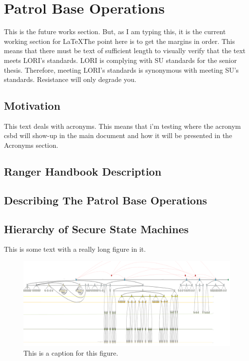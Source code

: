 \documentclass[../../main/main.tex]{subfiles}
\begin{document}
\chapter{Patrol Base Operations}
This is the future works section. But, as I am typing this, it is the current working section for \LaTeX\.  The point here is to get the margins in order.   This means that there must be text of sufficient length to visually verify that the text meets LORI's standards.  LORI is complying with SU standards for the senior thesis.  Therefore, meeting LORI's standards is synonymous with meeting SU's standards.  Resistance will only degrade you.
\section{Motivation}
This text deals with acronyms.  This means that i'm testing where the acronym \Gls{csbd} will show-up in the main document and how it will be presented in the Acronyms section.

\section{Ranger Handbook Description}

\section{Describing The Patrol Base Operations}

\section{Hierarchy of Secure State Machines}
This is some text with a really long figure in it.

\begin{figure}[t]
\includegraphics[width=\textwidth]{../figures/overalldiagramsquashed.png}
\caption{This is a caption for this figure.}
\end{figure}
\end{document}
